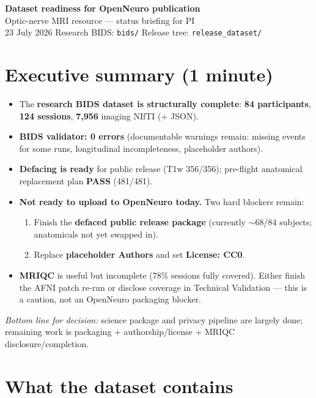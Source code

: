 \documentclass[11pt,a4paper]{article}
\begin{document}
\begin{center}
{\LARGE\bfseries Dataset readiness for OpenNeuro publication}\\[6pt]
{\large Optic-nerve MRI resource --- status briefing for PI}\\[4pt]
{\normalsize 23 July 2026 \quad\cdot\quad Research BIDS: \texttt{bids/} \quad\cdot\quad Release tree: \texttt{release\_dataset/}}
\end{center}

\vspace{4mm}

\section*{Executive summary (1 minute)}

\begin{itemize}[leftmargin=1.2em,itemsep=2pt]
\item The \textbf{research BIDS dataset is structurally complete}: \textbf{84 participants}, \textbf{124 sessions}, \textbf{7{,}956} imaging NIfTI (+ JSON).
\item \textbf{BIDS validator: 0 errors} (documentable warnings remain: missing events for some runs, longitudinal incompleteness, placeholder authors).
\item \textbf{Defacing is ready} for public release (T1w 356/356); pre-flight anatomical replacement plan \textbf{PASS} (481/481).
\item \textbf{Not ready to upload to OpenNeuro today.} Two hard blockers remain:
  \begin{enumerate}[leftmargin=1.4em,itemsep=1pt]
  \item Finish the \textbf{defaced public release package} (currently $\sim$68/84 subjects; anatomicals not yet swapped in).
  \item Replace \textbf{placeholder Authors} and set \textbf{License: CC0}.
  \end{enumerate}
\item \textbf{MRIQC} is useful but incomplete (78\% sessions fully covered). Either finish the AFNI patch re-run or disclose coverage in Technical Validation --- this is a caution, not an OpenNeuro packaging blocker.
\end{itemize}

\noindent\textit{Bottom line for decision:} science package and privacy pipeline are largely done; remaining work is packaging + authorship/license + MRIQC disclosure/completion.

\section{What the dataset contains}
\end{document}
